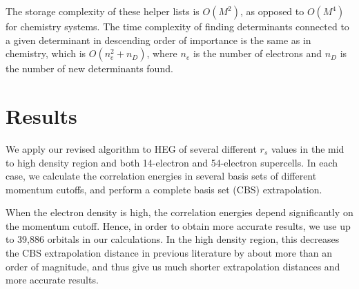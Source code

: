 The storage complexity of these helper lists is $O(M^2)$, as opposed to $O(M^4)$ for chemistry systems.
The time complexity of finding determinants connected to a given determinant in descending order of importance is the same as in chemistry, which is $O(n_e^2 + n_D)$, where $n_e$ is the number of electrons and $n_D$ is the number of new determinants found.

\section{Results}
\label{heg:results}
We apply our revised algorithm to HEG of several different $r_s$ values in the mid to high density region and both 14-electron and 54-electron supercells.
In each case, we calculate the correlation energies in several basis sets of different momentum cutoffs, and perform a complete basis set (CBS) extrapolation.

When the electron density is high, the correlation energies depend significantly on the momentum cutoff.
Hence, in order to obtain more accurate results, we use up to 39,886 orbitals in our calculations.
In the high density region, this decreases the CBS extrapolation distance in previous literature by about more than an order of magnitude, and thus give us much shorter extrapolation distances and more accurate results.

